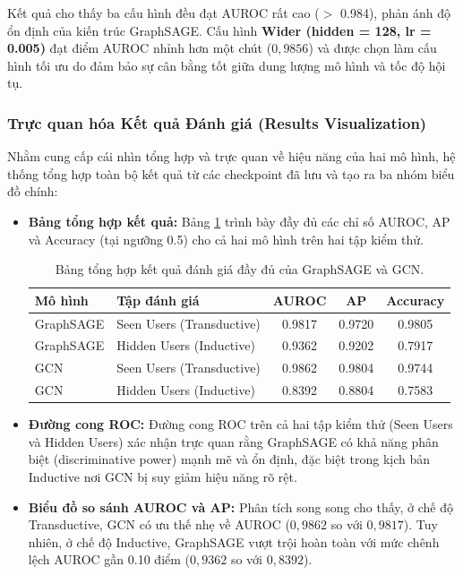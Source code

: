 Kết quả cho thấy ba cấu hình đều đạt AUROC rất cao ($>$ 0.984), phản ánh độ ổn định của kiến trúc GraphSAGE. Cấu hình \textbf{Wider (hidden = 128, lr = 0.005)} đạt điểm AUROC nhỉnh hơn một chút ($0{,}9856$) và được chọn làm cấu hình tối ưu do đảm bảo sự cân bằng tốt giữa dung lượng mô hình và tốc độ hội tụ.

\subsubsection{Trực quan hóa Kết quả Đánh giá (Results Visualization)}

Nhằm cung cấp cái nhìn tổng hợp và trực quan về hiệu năng của hai mô hình, hệ thống tổng hợp toàn bộ kết quả từ các checkpoint đã lưu và tạo ra ba nhóm biểu đồ chính:

\begin{itemize}
    \item \textbf{Bảng tổng hợp kết quả:} Bảng \ref{tab:results} trình bày đầy đủ các chỉ số AUROC, AP và Accuracy (tại ngưỡng 0.5) cho cả hai mô hình trên hai tập kiểm thử.

\begin{table}[h]
    \centering
    \begin{tabular}{llccc}
        \hline
        \textbf{Mô hình} & \textbf{Tập đánh giá} & \textbf{AUROC} & \textbf{AP} & \textbf{Accuracy} \\
        \hline
        GraphSAGE & Seen Users (Transductive) & 0.9817 & 0.9720 & 0.9805 \\
        GraphSAGE & Hidden Users (Inductive)  & 0.9362 & 0.9202 & 0.7917 \\
        GCN       & Seen Users (Transductive) & 0.9862 & 0.9804 & 0.9744 \\
        GCN       & Hidden Users (Inductive)  & 0.8392 & 0.8804 & 0.7583 \\
        \hline
    \end{tabular}
    \caption{Bảng tổng hợp kết quả đánh giá đầy đủ của GraphSAGE và GCN.}
    \label{tab:results}
\end{table}

    \item \textbf{Đường cong ROC:} Đường cong ROC trên cả hai tập kiểm thử (Seen Users và Hidden Users) xác nhận trực quan rằng GraphSAGE có khả năng phân biệt (discriminative power) mạnh mẽ và ổn định, đặc biệt trong kịch bản Inductive nơi GCN bị suy giảm hiệu năng rõ rệt.
    \item \textbf{Biểu đồ so sánh AUROC và AP:} Phân tích song song cho thấy, ở chế độ Transductive, GCN có ưu thế nhẹ về AUROC ($0{,}9862$ so với $0{,}9817$). Tuy nhiên, ở chế độ Inductive, GraphSAGE vượt trội hoàn toàn với mức chênh lệch AUROC gần 0.10 điểm ($0{,}9362$ so với $0{,}8392$).
\end{itemize}

